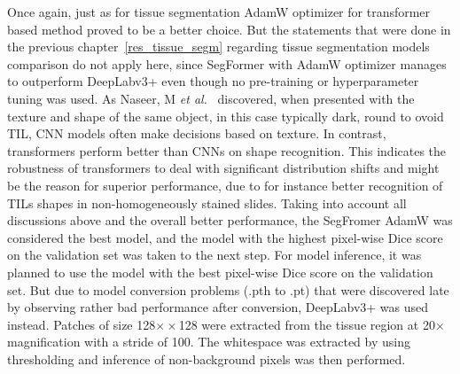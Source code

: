 Once again, just as for tissue segmentation AdamW optimizer for transformer
based method proved to be a better choice. 
But the statements that were done in the previous chapter~\ref{res_tissue_segm}
regarding tissue segmentation models comparison do not apply here, since SegFormer with AdamW
optimizer manages to outperform DeepLabv3+ even though no pre-training
or hyperparameter tuning was used. 
As Naseer, M \textit{et al.}~\cite{naseer2021intriguing} discovered, when presented
with the texture and shape of the same object, in this case typically dark,
round to ovoid TIL, CNN models often make decisions based on texture. In contrast,
transformers perform better than CNNs on shape recognition. This indicates the
robustness of transformers to deal with significant distribution shifts and might
be the reason for superior performance, due to for instance better recognition of
TILs shapes in non-homogeneously stained slides. Taking into account all
discussions above and the overall better performance, the SegFromer AdamW was
considered the best model, and the model with the highest pixel-wise Dice score
on the validation set was taken to the next step. 
For model inference, it was planned to use the model with the best pixel-wise Dice score on the validation set.
But due to model conversion problems (.pth to .pt) that were discovered late by observing rather bad performance after conversion, DeepLabv3+ was used instead.
Patches of size 128$×\times$128 were extracted from the tissue region at 20$\times$ magnification
with a stride of 100. The whitespace was extracted by using thresholding and
inference of non-background pixels was then performed. 

